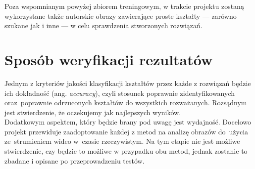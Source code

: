 \documentclass[11pt,a4paper]{article}
\begin{document}
Poza wspomnianym powyżej zbiorem treningowym, w trakcie projektu zostaną wykorzystane także autorskie obrazy zawierające proste kształty --- zarówno szukane jak i inne --- w celu sprawdzenia stworzonych rozwiązań.

\section{Sposób weryfikacji rezultatów} %

Jednym z kryteriów jakości klasyfikacji kształtów przez każde z rozwiązań będzie ich dokładność (ang. \emph{accuracy}), czyli stosunek poprawnie zidentyfikowanych oraz~poprawnie odrzuconych kształtów do wszystkich rozważanych. Rozsądnym jest stwierdzenie, że oczekujemy jak najlepszych wyników.\\

Dodatkowym aspektem, który będzie brany pod uwagę jest wydajność. Docelowo projekt przewiduje zaadoptowanie każdej z metod na analizę obrazów do~użycia ze~strumieniem wideo w~czasie rzeczywistym. Na tym etapie nie jest możliwe stwierdzenie, czy będzie to możliwe w przypadku obu metod, jednak zostanie to zbadane i opisane po przeprowadzeniu testów.
\end{document}
